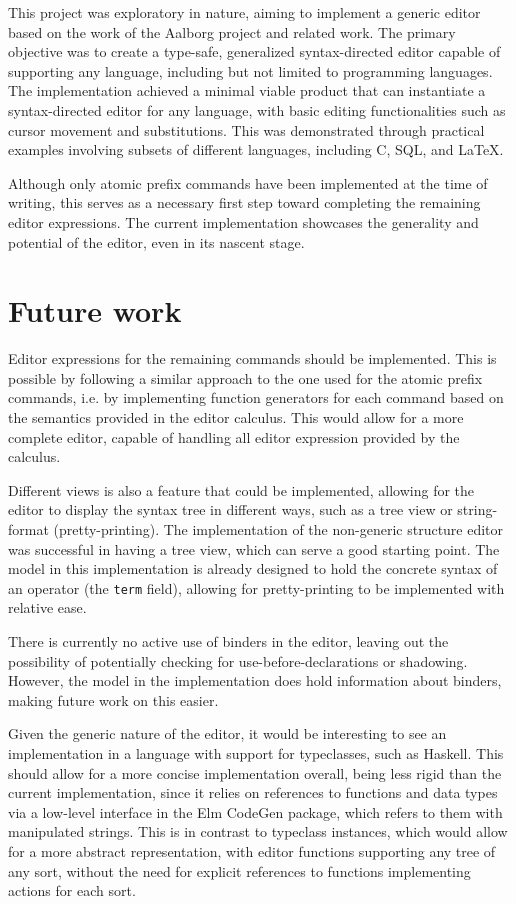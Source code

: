 This project was exploratory in nature, aiming to implement a generic editor based on the work of the Aalborg project\cite{aalborg} and related work. The primary objective was to create a type-safe, generalized syntax-directed editor capable of supporting any language, including but not limited to programming languages. The implementation achieved a minimal viable product that can instantiate a syntax-directed editor for any language, with basic editing functionalities such as cursor movement and substitutions. This was demonstrated through practical examples involving subsets of different languages, including C, SQL, and LaTeX.

Although only atomic prefix commands have been implemented at the time of writing, this serves as a necessary first step toward completing the remaining editor expressions. The current implementation showcases the generality and potential of the editor, even in its nascent stage.

\section{Future work}
Editor expressions for the remaining commands should be implemented. This is possible by following a similar approach to the one used for the atomic prefix commands, i.e. by implementing function generators for each command based on the semantics provided in the editor calculus. This would allow for a more complete editor, capable of handling all editor expression provided by the calculus.

Different views is also a feature that could be implemented, allowing for the editor to display the syntax tree in different ways, such as a tree view or string-format (pretty-printing). The implementation of the non-generic
structure editor\cite{KU-bach} was successful in having a tree view, which can serve
a good starting point. The model in this implementation is already designed to hold the concrete syntax of an operator (the \texttt{term} field), allowing for pretty-printing to be implemented with relative ease.

There is currently no active use of binders in the editor, leaving
out the possibility of potentially checking for use-before-declarations or
shadowing. However, the model in the implementation does hold information about binders, making future work on this easier.

Given the generic nature of the editor, it would be interesting to see
an implementation in a language with support for typeclasses, such as Haskell.
This should allow for a more concise implementation overall, being less rigid
than the current implementation, since it relies on references to functions and
data types via a low-level interface in the Elm CodeGen package, which refers
to them with manipulated strings. This is in contrast to typeclass
instances, which would allow for a more abstract representation, with editor functions supporting any tree of any sort, without the need for explicit references to functions implementing actions for each sort.
